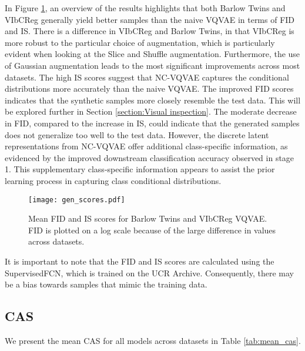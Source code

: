 \documentclass[../../thesis.tex]{subfiles}
\begin{document}
In Figure \ref{fig:mean_gen_scores}, an overview of the results highlights that both Barlow Twins and VIbCReg generally yield better samples than the naive VQVAE in terms of FID and IS. There is a difference in VIbCReg and Barlow Twins, in that VIbCReg is more robust to the particular choice of augmentation, which is particularly evident when looking at the Slice and Shuffle augmentation. Furthermore, the use of Gaussian augmentation leads to the most significant improvements across most datasets. The high IS scores suggest that NC-VQVAE captures the conditional distributions more accurately than the naive VQVAE. The improved FID scores indicates that the synthetic samples more closely resemble the test data. This will be explored further in Section \ref{section:Visual inspection}. The moderate decrease in FID, compared to the increase in IS, could indicate that the generated samples does not generalize too well to the test data. However, the discrete latent representations from NC-VQVAE offer additional class-specific information, as evidenced by the improved downstream classification accuracy observed in stage 1. This supplementary class-specific information appears to assist the prior learning process in capturing class conditional distributions.

\begin{figure}[h]
    \texttt{[image: gen\_scores.pdf]}
    \centering  
    \caption{Mean FID and IS scores for Barlow Twins and VIbCReg VQVAE. FID is plotted on a log scale because of the large difference in values across datasets.}
    \label{fig:mean_gen_scores}
\end{figure}

It is important to note that the FID and IS scores are calculated using the SupervisedFCN, which is trained on the UCR Archive. Consequently, there may be a bias towards samples that mimic the training data.


\subsection{CAS}

We present the mean CAS for all models across datasets in Table \ref{tab:mean_cas}.
\end{document}
